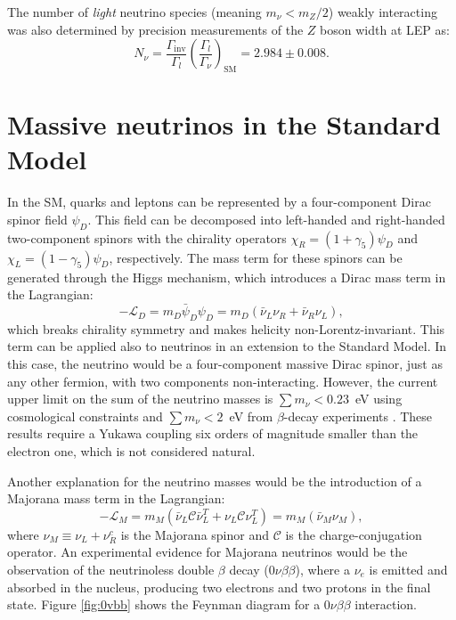 The number of \emph{light} neutrino species (meaning $m_{\nu} < m_{Z}/2$) weakly interacting  was also determined by precision measurements of the $Z$ boson width at LEP as:
\begin{equation}
   N_{\nu} = \frac{\Gamma_{\mathrm{inv}}}{\Gamma_l}
   \left(\frac{\Gamma_{l}}{\Gamma_{\nu}}\right)_{\mathrm{SM}}=2.984\pm0.008.
\end{equation}

\section{Massive neutrinos in the Standard Model}
In the SM, quarks and leptons can be represented by a four-component Dirac spinor field $\psi_{D}$. This field can be decomposed into left-handed and right-handed two-component spinors with the chirality operators $\chi_{R} = (1+\gamma_5)\psi_D$ and $\chi_{L} = (1-\gamma_5)\psi_D$, respectively. The mass term for these spinors can be generated through the Higgs mechanism, which introduces a Dirac mass term in the Lagrangian:
\begin{equation}
    -\mathcal{L}_D = m_D\bar{\psi}_D\psi_D = m_D(\bar{\nu}_L\nu_R + \bar{\nu}_R\nu_L),
\end{equation}
which breaks chirality symmetry and makes helicity non-Lorentz-invariant.
This term can be applied also to neutrinos in an extension to the Standard Model. In this case, the neutrino would be a four-component massive Dirac spinor, just as any other fermion, with two components non-interacting.
However, the current upper limit on the sum of the neutrino masses is $\sum m_{\nu} < 0.23$~eV using cosmological constraints \cite{Ade:2015xua} and $\sum m_{\nu} < 2$~eV from $\beta$-decay experiments \cite{Otten:2008zz}. These results require a Yukawa coupling six orders of magnitude smaller than the electron one, which is not considered natural.

Another explanation for the neutrino masses would be the introduction of a Majorana mass term in the Lagrangian:
\begin{equation}
    -\mathcal{L}_M = m_M(\bar{\nu}_L\mathcal{C}\bar{\nu}^{T}_L+\nu_{L}\mathcal{C}\nu^T_L) = m_M(\bar{\nu}_M\nu_M),
\end{equation}
where $\nu_{M} \equiv \nu_L + \nu^c_R$ is the Majorana spinor and $\mathcal{C}$ is the charge-conjugation operator. An experimental evidence for Majorana neutrinos would be the observation of the neutrinoless double $\beta$ decay ($0\nu\beta\beta$), where a $\nu_{e}$ is emitted and absorbed in the nucleus, producing two electrons and two protons in the final state. Figure \ref{fig:0vbb} shows the Feynman diagram for a $0\nu\beta\beta$ interaction. 

